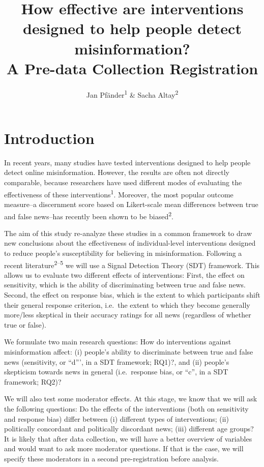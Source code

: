 \documentclass[
  man,mask,floatsintext]{apa6}
\title{How effective are interventions designed to help people detect misinformation?\\
A Pre-data Collection Registration}
\author{Jan Pfänder\textsuperscript{1} \& Sacha Altay\textsuperscript{2}}
\date{}
\affiliation{\vspace{0.5cm}\textsuperscript{1} Institut Jean Nicod, Département d'études cognitives, ENS, EHESS, PSL University, CNRS, France\\\textsuperscript{2} Department of Political Science, University of Zurich, Switzerland}
\begin{document}
\maketitle

\section{Introduction}\label{introduction}

In recent years, many studies have tested interventions designed to help people detect online misinformation. However, the results are often not directly comparable, because researchers have used different modes of evaluating the effectiveness of these interventions\textsuperscript{1}. Moreover, the most popular outcome measure--a discernment score based on Likert-scale mean differences between true and false news--has recently been shown to be biased\textsuperscript{2}.

The aim of this study re-analyze these studies in a common framework to draw new conclusions about the effectiveness of individual-level interventions designed to reduce people's susceptibility for believing in misinformation. Following a recent literature\textsuperscript{2--5} we will use a Signal Detection Theory (SDT) framework. This allows us to evaluate two different effects of interventions: First, the effect on sensitivity, which is the ability of discriminating between true and false news. Second, the effect on response bias, which is the extent to which participants shift their general response criterion, i.e.~the extent to which they become generally more/less skeptical in their accuracy ratings for all news (regardless of whether true or false).

We formulate two main research questions: How do interventions against misinformation affect: (i) people's ability to discriminate between true and false news (sensitivity, or ``d''', in a SDT framework; RQ1)?, and (ii) people's skepticism towards news in general (i.e.~response bias, or ``c'', in a SDT framework; RQ2)?

We will also test some moderator effects. At this stage, we know that we will ask the following questions: Do the effects of the interventions (both on sensitivity and response bias) differ between (i) different types of interventions; (ii) politically concordant and politically discordant news; (iii) different age groups? It is likely that after data collection, we will have a better overview of variables and would want to ask more moderator questions. If that is the case, we will specify these moderators in a second pre-registration before analysis.
\end{document}
